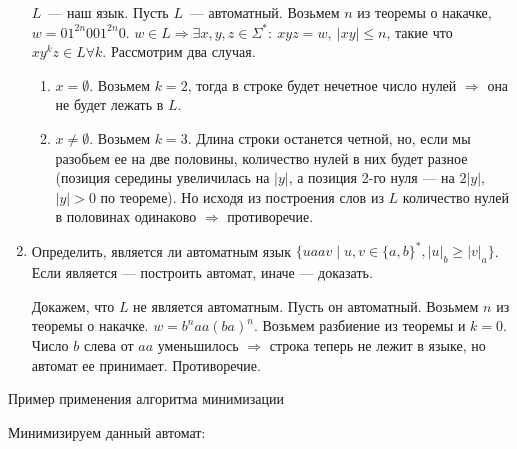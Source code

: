 \documentclass[12pt]{article}
\begin{document}
\begin{enumerate}
	      $L$~--- наш язык. Пусть $L$~--- автоматный. Возьмем $n$ из теоремы о накачке,
	      $w = 01^{2n}001^{2n}0$.
	      $w \in L \Rightarrow \exists x,y,z \in \Sigma ^ * :\ xyz=w,\ |xy| \le n$, такие что
	      $xy ^ k z \in L \forall k$. Рассмотрим два случая.
	      \begin{enumerate}
		      \item $x = \emptyset$. Возьмем $k=2$, тогда в строке будет нечетное число нулей $\Rightarrow$
		            она не будет лежать в $L$.
		      \item $x \ne \emptyset$. Возьмем $k = 3$. Длина строки останется четной, но, если мы разобьем ее на две половины,
		            количество нулей в них будет разное (позиция середины увеличилась на $|y|$,
		            а позиция 2-го нуля --- на $2|y|$, $|y| > 0$ по теореме). Но исходя из построения
		            слов из $L$ количество нулей в половинах одинаково $\Rightarrow$ противоречие.
	      \end{enumerate}
	\item Определить, является ли автоматным язык $\{ u a a v \mid u, v \in \{ a, b \}^* , |u|_b \geq |v|_a \}$. Если является --- построить автомат, иначе --- доказать.

	      Докажем, что $L$ не является автоматным. Пусть он автоматный.
	      Возьмем $n$ из теоремы о
	      накачке. $w = b^{n} aa (ba) ^ n$. Возьмем разбиение из теоремы и $k = 0$. Число $b$ слева
	      от $aa$ уменьшилось $\Rightarrow$ строка теперь не лежит в языке, но автомат ее принимает.
	      Противоречие.
\end{enumerate}

\newpage

\begin{center}
	\Large{Пример применения алгоритма минимизации}
\end{center}

\bigskip

Минимизируем данный автомат:
\end{document}
